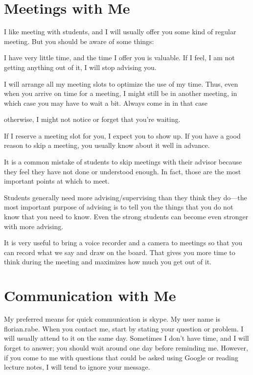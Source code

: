 \documentclass[12pt]{article}
\begin{document}
\section{Meetings with Me}

I like meeting with students, and I will usually offer you some kind of regular meeting. But you should be aware of some things:
\begin{compactitem}
\item I have very little time, and the time I offer you is valuable. If I feel, I am not getting anything out of it, I will stop advising you.
\item I will arrange all my meeting slots to optimize the use of my time. Thus, even when you arrive on time for a meeting, I might still be in another meeting, in which case you may have to wait a bit. Always come in in that case \item otherwise, I might not notice or forget that you're waiting.
\item If I reserve a meeting slot for you, I expect you to show up. If you have a good reason to skip a meeting, you usually know about it well in advance.
\end{compactitem}
\medskip

It is a common mistake of students to skip meetings with their advisor because they feel they have not done or understood enough.
In fact, those are the most important points at which to meet.

Students generally need more advising/supervising than they think they do---the most important purpose of advising is to tell you the things that you do not know that you need to know.
Even the strong students can become even stronger with more advising.
\medskip

It is very useful to bring a voice recorder and a camera to meetings so that you can record what we say and draw on the board. That gives you more time to think during the meeting and maximizes how much you get out of it.

\section{Communication with Me}

My preferred means for quick communication is skype. My user name is florian.rabe. When you contact me, start by stating your question or problem. I will usually attend to it on the same day. Sometimes I don't have time, and I will forget to answer; you should wait around one day before reminding me. However, if you come to me with questions that could be asked using Google or reading lecture notes, I will tend to ignore your message.
\medskip
\end{document}
